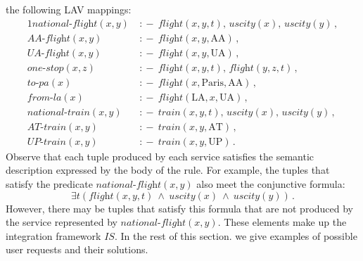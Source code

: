 \documentclass{llncs}
\newcommand{\qrule}{:\!\!-}
\newcommand{\AAflight}{\textit{AA-flight}}
\newcommand{\UAflight}{\textit{UA-flight}}
\newcommand{\ATtrain}{\textit{AT-train}}
\newcommand{\UPtrain}{\textit{UP-train}}
\newcommand{\flight}{\textit{flight}}
\newcommand{\train}{\textit{train}}
\newcommand{\UScity}{\textit{uscity}}
\renewcommand{\AA}{\text{AA}}
\newcommand{\UA}{\text{UA}}
\newcommand{\AT}{\text{AT}}
\newcommand{\UP}{\text{UP}}
\newcommand{\PA}{\text{Paris}}
\newcommand{\LA}{\text{LA}}
\newcommand{\nationalFlight}{\textit{national-flight}}
\newcommand{\nationalTrain}{\textit{national-train}}
\newcommand{\onestop}{\textit{one-stop}}
\newcommand{\toPA}{\textit{to-pa}}
\newcommand{\onestopPA}{\textit{onestop-to-pa}}
\newcommand{\fromLA}{\textit{from-la}}
\begin{document}
the following LAV mappings:
\begin{alignat*}{1}
\nationalFlight(x,y)\ &\qrule\ \flight(x,y,t),\,\UScity(x),\,\UScity(y)\,, \\
\AAflight(x,y)\       &\qrule\ \flight(x,y,\AA)\,, \\
\UAflight(x,y)\       &\qrule\ \flight(x,y,\UA)\,, \\
\onestop(x,z)\        &\qrule\ \flight(x,y,t),\,\flight(y,z,t)\,, \\
\toPA(x)\             &\qrule\ \flight(x,\PA,\AA)\,, \\
\fromLA(x)\           &\qrule\ \flight(\LA,x,\UA)\,, \\
\nationalTrain(x,y)\  &\qrule\ \train(x,y,t),\,\UScity(x),\,\UScity(y)\,, \\
\ATtrain(x,y)\        &\qrule\ \train(x,y,\AT)\,, \\
\UPtrain(x,y)\        &\qrule\ \train(x,y,\UP)\,.
\end{alignat*}
Observe that each tuple produced by each service satisfies the semantic description
expressed by the body of the rule. For example, the tuples that satisfy the predicate
$\nationalFlight(x,y)$ also meet the conjunctive formula:
\[ \exists t(\flight(x,y,t)\ \land\ \UScity(x)\ \land\ \UScity(y))\,. \]
However, there may be tuples that satisfy this formula that are not
produced by the service represented by $\nationalFlight(x,y)$.
These elements make up the integration framework $IS$. In the rest of this section.
we give examples of possible user requests and their solutions.
\end{document}
